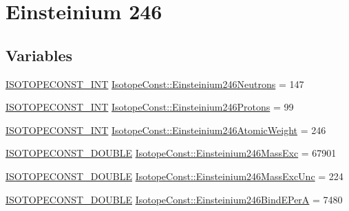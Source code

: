\hypertarget{group___isotope_const-_einsteinium-_es246}{}\section{Einsteinium 246}
\label{group___isotope_const-_einsteinium-_es246}
\subsection*{Variables}
\begin{DoxyCompactItemize}
\item 
\mbox{\hyperlink{group___isotope_const-_macros_ga5f18360b3e99483a35c32d789e62621c}{I\+S\+O\+T\+O\+P\+E\+C\+O\+N\+S\+T\+\_\+\+I\+NT}} \mbox{\hyperlink{group___isotope_const-_einsteinium-_es246_gadc7974df5f9e2d6448c3bad67e4e7c2c}{Isotope\+Const\+::\+Einsteinium246\+Neutrons}} = 147
\item 
\mbox{\hyperlink{group___isotope_const-_macros_ga5f18360b3e99483a35c32d789e62621c}{I\+S\+O\+T\+O\+P\+E\+C\+O\+N\+S\+T\+\_\+\+I\+NT}} \mbox{\hyperlink{group___isotope_const-_einsteinium-_es246_gaf683a8947cca6b0b0acbab0bf027ae7f}{Isotope\+Const\+::\+Einsteinium246\+Protons}} = 99
\item 
\mbox{\hyperlink{group___isotope_const-_macros_ga5f18360b3e99483a35c32d789e62621c}{I\+S\+O\+T\+O\+P\+E\+C\+O\+N\+S\+T\+\_\+\+I\+NT}} \mbox{\hyperlink{group___isotope_const-_einsteinium-_es246_ga03fd3aaa8b0cba73bd15949641470a8a}{Isotope\+Const\+::\+Einsteinium246\+Atomic\+Weight}} = 246
\item 
\mbox{\hyperlink{group___isotope_const-_macros_ga8f45a7272ce02c0b4c65c44636ed719a}{I\+S\+O\+T\+O\+P\+E\+C\+O\+N\+S\+T\+\_\+\+D\+O\+U\+B\+LE}} \mbox{\hyperlink{group___isotope_const-_einsteinium-_es246_ga4dbb861c42a212774eb209f54fd11056}{Isotope\+Const\+::\+Einsteinium246\+Mass\+Exc}} = 67901
\item 
\mbox{\hyperlink{group___isotope_const-_macros_ga8f45a7272ce02c0b4c65c44636ed719a}{I\+S\+O\+T\+O\+P\+E\+C\+O\+N\+S\+T\+\_\+\+D\+O\+U\+B\+LE}} \mbox{\hyperlink{group___isotope_const-_einsteinium-_es246_ga6172cc974be2f1272fc672d13ce59e42}{Isotope\+Const\+::\+Einsteinium246\+Mass\+Exc\+Unc}} = 224
\item 
\mbox{\hyperlink{group___isotope_const-_macros_ga8f45a7272ce02c0b4c65c44636ed719a}{I\+S\+O\+T\+O\+P\+E\+C\+O\+N\+S\+T\+\_\+\+D\+O\+U\+B\+LE}} \mbox{\hyperlink{group___isotope_const-_einsteinium-_es246_ga73b9f2a47293fe1d6e42ad2ea6c03d7c}{Isotope\+Const\+::\+Einsteinium246\+Bind\+E\+PerA}} = 7480
\item 

\end{DoxyCompactItemize}
